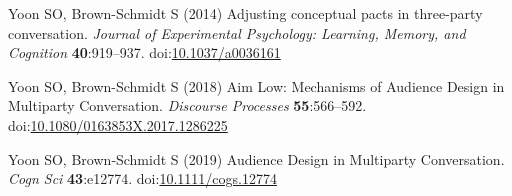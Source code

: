 \documentclass[
  english,
  a4paper,
]{article}
\newlength{\cslhangindent}
\newlength{\cslentryspacingunit} %
\newenvironment{CSLReferences}[2] %
 {%
  \setlength{\parindent}{0pt}
  \ifodd #1
  \let\oldpar\par
  \def\par{\hangindent=\cslhangindent\oldpar}
  \fi
  \setlength{\parskip}{#2\cslentryspacingunit}
 }%
 {}
\begin{document}
\begin{CSLReferences}{1}{0}
\leavevmode{}%
Yoon SO, Brown-Schmidt S (2014) Adjusting conceptual pacts in three-party conversation. \emph{Journal of Experimental Psychology: Learning, Memory, and Cognition} \textbf{40}:919--937. doi:\href{https://doi.org/10.1037/a0036161}{10.1037/a0036161}

\leavevmode{}%
Yoon SO, Brown-Schmidt S (2018) Aim {Low}: {Mechanisms} of {Audience Design} in {Multiparty Conversation}. \emph{Discourse Processes} \textbf{55}:566--592. doi:\href{https://doi.org/10.1080/0163853X.2017.1286225}{10.1080/0163853X.2017.1286225}

\leavevmode{}%
Yoon SO, Brown‐Schmidt S (2019) Audience {Design} in {Multiparty Conversation}. \emph{Cogn Sci} \textbf{43}:e12774. doi:\href{https://doi.org/10.1111/cogs.12774}{10.1111/cogs.12774}

\end{CSLReferences}
\end{document}
